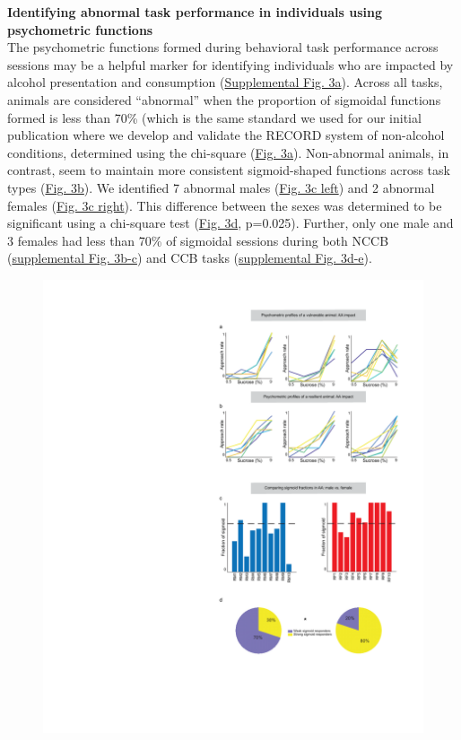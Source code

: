 \documentclass{article}
\begin{document}
\noindent\textbf{Identifying abnormal task performance in individuals using psychometric functions}\\
The psychometric functions formed during behavioral task performance across sessions may be a helpful marker for identifying individuals who are impacted by alcohol presentation and consumption (\hyperref[fig:Alcohol_SI_3]{Supplemental Fig. 3a}). Across all tasks, animals are considered “abnormal” when the proportion of sigmoidal functions formed is less than 70\% (which is the same standard we used for our initial publication where we develop and validate the RECORD system\cite{ibanez2024record} of non-alcohol conditions, determined using the chi-square (\hyperref[fig:alcohol_main_3]{Fig. 3a}). Non-abnormal animals, in contrast, seem to maintain more consistent sigmoid-shaped functions across task types (\hyperref[fig:alcohol_main_3]{Fig. 3b}). We identified 7 abnormal males (\hyperref[fig:alcohol_main_3]{Fig. 3c left}) and 2 abnormal females (\hyperref[fig:alcohol_main_3]{Fig. 3c right}). This difference between the sexes was determined to be significant using a chi-square test (\hyperref[fig:alcohol_main_3]{Fig. 3d}, p=0.025). Further, only one male and 3 females had less than 70\% of sigmoidal sessions during both NCCB (\hyperref[fig:Alcohol_SI_3]{supplemental Fig. 3b-c}) and CCB tasks (\hyperref[fig:Alcohol_SI_3]{supplemental Fig. 3d-e}).

\begin{figure}[H] %
  \centering
  \includegraphics[width=\textwidth, trim=50 50 50 50]{Figs/Alcohol_main_3.pdf}
\end{figure}
\end{document}
